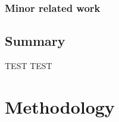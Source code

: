 \documentclass[a4paper,10pt,twocolumn]{article}
\numberwithin{figure}{section}
\numberwithin{table}{section}
\begin{document}
\subsubsection{Minor related work}

\subsection{Summary}

\newpage
TEST
\newpage
TEST
\newpage


\section{Methodology}



\end{document}
